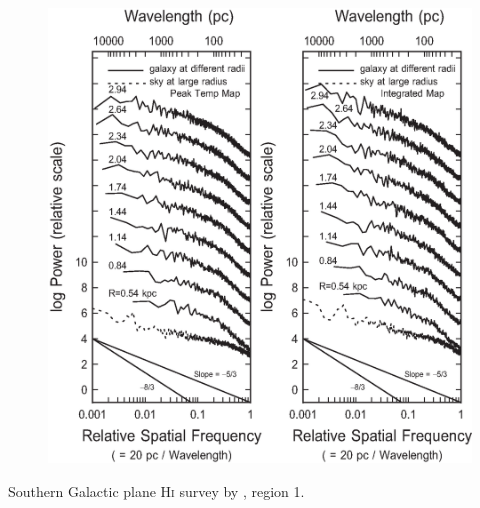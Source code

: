 \documentclass[12pt]{article}
\begin{document}
            \begin{figure}[hb]
              \centering
              \includegraphics[totalheight=80 mm]{img/Elmegreen2001.eps}
            \end{figure}   
        \clearpage
        \begin{small}
        Southern Galactic plane H\textsc{i} survey by \cite{2001ApJ...561..264D}, region 1.
        \end{small}
\end{document}
